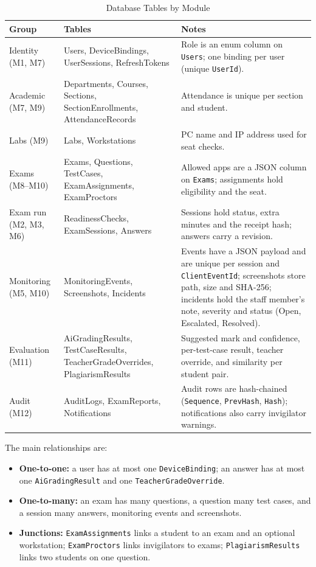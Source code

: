 \begin{table}[!htb]
\centering
\caption{Database Tables by Module}
\label{tab:db_tables}
{\small\renewcommand{\arraystretch}{1.15}
\begin{tabularx}{\textwidth}{>{\raggedright\arraybackslash}p{3.2cm}>{\raggedright\arraybackslash}p{5.0cm}>{\raggedright\arraybackslash}X}
\hline\hline
\textbf{Group} & \textbf{Tables} & \textbf{Notes} \\
\hline
Identity (M1, M7) & Users, DeviceBindings, UserSessions, RefreshTokens & Role is an enum column on \texttt{Users}; one binding per user (unique \texttt{UserId}). \\
Academic (M7, M9) & Departments, Courses, Sections, SectionEnrollments, AttendanceRecords & Attendance is unique per section and student. \\
Labs (M9) & Labs, Workstations & PC name and IP address used for seat checks. \\
Exams (M8--M10) & Exams, Questions, TestCases, ExamAssignments, ExamProctors & Allowed apps are a JSON column on \texttt{Exams}; assignments hold eligibility and the seat. \\
Exam run (M2, M3, M6) & ReadinessChecks, ExamSessions, Answers & Sessions hold status, extra minutes and the receipt hash; answers carry a revision. \\
Monitoring (M5, M10) & MonitoringEvents, Screenshots, Incidents & Events have a JSON payload and are unique per session and \texttt{ClientEventId}; screenshots store path, size and SHA-256; incidents hold the staff member's note, severity and status (Open, Escalated, Resolved). \\
Evaluation (M11) & AiGradingResults, TestCaseResults, TeacherGradeOverrides, PlagiarismResults & Suggested mark and confidence, per-test-case result, teacher override, and similarity per student pair. \\
Audit (M12) & AuditLogs, ExamReports, Notifications & Audit rows are hash-chained (\texttt{Sequence}, \texttt{PrevHash}, \texttt{Hash}); notifications also carry invigilator warnings. \\
\hline\hline
\end{tabularx}}
\end{table}

The main relationships are:
\begin{itemize}[nosep]
    \item \textbf{One-to-one:} a user has at most one \texttt{DeviceBinding}; an answer has at most one \texttt{AiGradingResult} and one \texttt{TeacherGradeOverride}.
    \item \textbf{One-to-many:} an exam has many questions, a question many test cases, and a session many answers, monitoring events and screenshots.
    \item \textbf{Junctions:} \texttt{ExamAssignments} links a student to an exam and an optional workstation; \texttt{ExamProctors} links invigilators to exams; \texttt{PlagiarismResults} links two students on one question.
\end{itemize}

